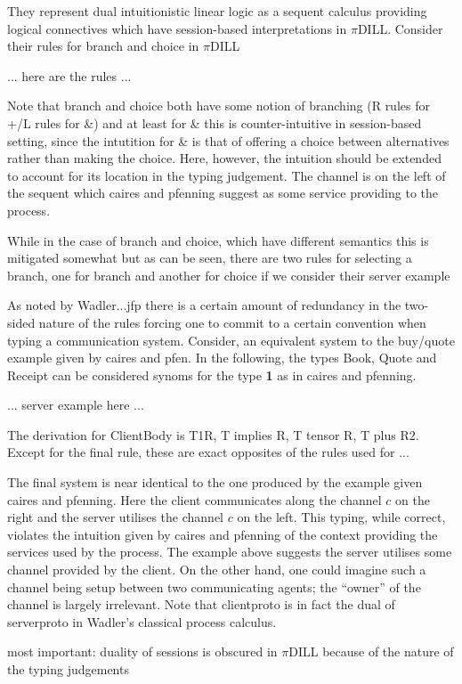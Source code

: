 \documentclass{mprop}
\newcommand{\1}{\textbf{1}\xspace}
\begin{document}
They represent dual intuitionistic linear logic as a sequent calculus providing logical connectives which have session-based interpretations in $\pi$DILL. Consider their rules for branch and choice in $\pi$DILL

... here are the rules ...

Note that branch and choice both have some notion of branching (R rules for +/L rules for \&) and at least for \& this is counter-intuitive in session-based setting, since the intutition for \& is that of offering a choice between alternatives rather than making the choice. Here, however, the intuition should be extended to account for its location in the typing judgement. The channel is on the left of the sequent which caires and pfenning suggest as some service providing to the process.

While in the case of branch and choice, which have different semantics this is mitigated somewhat but as can be seen, there are two rules for selecting a branch, one for branch and another for choice if we consider their server example

As noted by Wadler...jfp there is a certain amount of redundancy in the two-sided nature of the rules forcing one to commit to a certain convention when typing a communication system. Consider, an equivalent system to the buy/quote example given by caires and pfen. In the following, the types Book, Quote and Receipt can be considered synoms for the type \1 as in caires and pfenning.

... server example here ...

The derivation for ClientBody is T1R, T implies R, T tensor R, T plus R2. Except for the final rule, these are exact opposites of the rules used for ...

The final system is near identical to the one produced by the example given caires and pfenning. Here the client communicates along the channel $c$ on the right and the server utilises the channel $c$ on the left. This typing, while correct, violates the intuition given by caires and pfenning of the context providing the services used by the process. The example above suggests the server utilises some channel provided by the client. On the other hand, one could imagine such a channel being setup between two communicating agents; the ``owner'' of the channel is largely irrelevant. Note that clientproto is in fact the dual of serverproto in Wadler's classical process calculus.

most important: duality of sessions is obscured in $\pi$DILL because of the nature of the typing judgements
\end{document}
